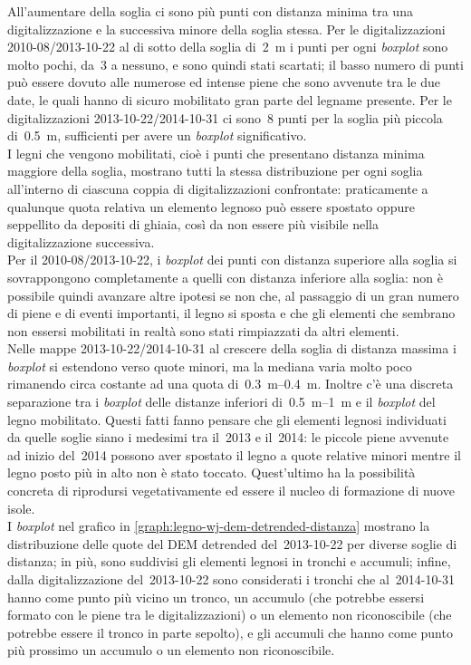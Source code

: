 All'aumentare della soglia ci sono più punti con distanza minima tra una digitalizzazione e la successiva minore della soglia stessa.
Per le digitalizzazioni 2010-08/2013-10-22 al di sotto della soglia di~\SI{2}{\m} i punti per ogni \emph{boxplot} sono molto pochi, da~3 a nessuno, e sono quindi stati scartati; il basso numero di punti può essere dovuto alle numerose ed intense piene che sono avvenute tra le due date, le quali hanno di sicuro mobilitato gran parte del legname presente.
Per le digitalizzazioni 2013-10-22/2014-10-31 ci sono~8 punti per la soglia più piccola di~\SI{0.5}{\m}, sufficienti per avere un \emph{boxplot} significativo.
\\
I legni che vengono mobilitati, cioè i punti che presentano distanza minima maggiore della soglia, mostrano tutti la stessa distribuzione per ogni soglia all'interno di ciascuna coppia di digitalizzazioni confrontate: praticamente a qualunque quota relativa un elemento legnoso può essere spostato oppure seppellito da depositi di ghiaia, così da non essere più visibile nella digitalizzazione successiva.
\\
Per il 2010-08/2013-10-22, i \emph{boxplot} dei punti con distanza superiore alla soglia si sovrappongono completamente a quelli con distanza inferiore alla soglia: non è possibile quindi avanzare altre ipotesi se non che, al passaggio di un gran numero di piene e di eventi importanti, il legno si sposta e che gli elementi che sembrano non essersi mobilitati in realtà sono stati rimpiazzati da altri elementi.
\\
Nelle mappe 2013-10-22/2014-10-31 al crescere della soglia di distanza massima i \emph{boxplot} si estendono verso quote minori, ma la mediana varia molto poco rimanendo circa costante ad una quota di~\SIrange[range-phrase = {-}, range-units = single]{0.3}{0.4}{\m}.
Inoltre c'è una discreta separazione tra i \emph{boxplot} delle distanze inferiori di~\SIrange[range-phrase = { e }]{0.5}{1}{\m} e il \emph{boxplot} del legno mobilitato.
Questi fatti fanno pensare che gli elementi legnosi individuati da quelle soglie siano i medesimi tra il~2013 e il~2014: le piccole piene avvenute ad inizio del~2014 possono aver spostato il legno a quote relative minori mentre il legno posto più in alto non è stato toccato.
Quest'ultimo ha la possibilità concreta di riprodursi vegetativamente ed essere il nucleo di formazione di nuove isole.
\\
I \emph{boxplot} nel grafico in \cref{graph:legno-wj-dem-detrended-distanza} mostrano la distribuzione delle quote del DEM detrended del~2013-10-22 per diverse soglie di distanza; in più, sono suddivisi gli elementi legnosi in tronchi e accumuli; infine, dalla digitalizzazione del~2013-10-22 sono considerati i tronchi che al~2014-10-31 hanno come punto più vicino un tronco, un accumulo (che potrebbe essersi formato con le piene tra le digitalizzazioni) o un elemento non riconoscibile (che potrebbe essere il tronco in parte sepolto), e gli accumuli che hanno come punto più prossimo un accumulo o un elemento non riconoscibile.
